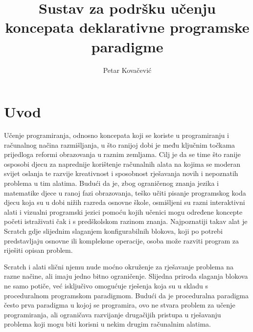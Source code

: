 \documentclass[times, utf8, diplomski, numeric]{fer}
\begin{document}

\title{Sustav za podršku učenju koncepata deklarativne programske paradigme}

\author{Petar Kovačević}

\maketitle



\zahvala{}

\tableofcontents



\chapter{Uvod}

Učenje programiranja, odnosno koncepata koji se koriste u programiranju i računalnog načina razmišljanja, u što ranijoj dobi je među ključnim točkama prijedloga reformi obrazovanja u raznim zemljama.
Cilj je da se time što ranije osposobi djecu za naprednije korištenje računalnih alata na kojima se moderan svijet oslanja te razvije kreativnost i sposobnost rješavanja novih i nepoznatih problema u tim alatima.
Budući da je, zbog ograničenog znanja jezika i matematike djece u ranoj fazi obrazovanja, teško učiti pisanje programskog koda djecu koja su u dobi nižih razreda osnovne škole, osmišljeni su razni interaktivni alati i vizualni programski jezici pomoću kojih učenici mogu određene koncepte početi istraživati čak i s predškolskom razinom znanja.
Najpoznatiji takav alat je Scratch gdje slijednim slaganjem konfigurabilnih blokova, koji po potrebi predstavljaju osnovne ili kompleksne operacije, osoba može razviti program za riješiti opisan problem\citep{scratch}.

Scratch i alati slični njemu nude moćno okruženje za rješavanje problema na razne načine, ali imaju jedno bitno ograničenje.
Slijedna priroda slaganja blokova ne samo potiče, već isključivo omogućuje rješenja koja su u skladu s proceduralnom programskom paradigmom.
Budući da je proceduralna paradigma često prva paradigma u kojoj se programira, ovo ne stvara problem za učenje programiranja, ali ograničava razvijanje drugačijih pristupa u rješavanju problema koji mogu biti korisni u nekim drugim računalnim alatima.
\end{document}
